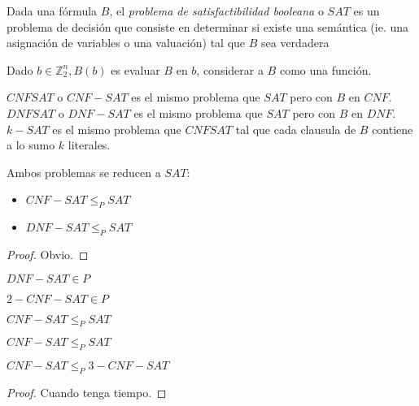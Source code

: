 \begin{definition}
Dada una fórmula $B$, el \emph{problema de satisfactibilidad booleana} o \emph{$SAT$} es un problema de decisión que consiste en determinar si existe una semántica (ie. una asignación de variables o una valuación) tal que $B$ sea verdadera 
\end{definition}

\begin{definition}
Dado $b \in \mathbb{Z}_2^n, B(b)$ es evaluar $B$ en $b$, considerar a $B$ como una función.
\end{definition}
\begin{definition}
$CNFSAT$ o $CNF-SAT$ es el mismo problema que $SAT$ pero con $B$ en $CNF$.\\
$DNFSAT$ o $DNF-SAT$ es el mismo problema que $SAT$ pero con $B$ en $DNF$.\\
$k-SAT$ es el mismo problema que $CNFSAT$ tal que cada clausula de $B$ contiene a lo sumo $k$ literales.
\end{definition}
\begin{proposition}
Ambos problemas se reducen a $SAT$:
\begin{itemize}
    \item $CNF-SAT \le_{P} SAT$
    \item $DNF-SAT \le_{P} SAT$
\end{itemize}
\end{proposition}
\begin{proof}
Obvio.
\end{proof}

\begin{theorem}
$DNF-SAT \in P$
\end{theorem}

\begin{theorem}
$2-CNF-SAT \in P$
\end{theorem}

\begin{theorem}
$CNF-SAT \le_P SAT$
\end{theorem}

\begin{theorem}
$CNF-SAT \le_P SAT$
\end{theorem}

\begin{theorem}
$CNF-SAT \le_P 3-CNF-SAT$
\end{theorem}
\begin{proof}
Cuando tenga tiempo.
\end{proof}

